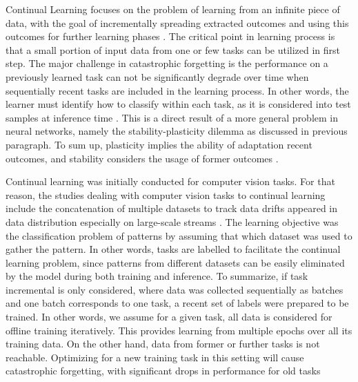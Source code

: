 \documentclass{article}
\begin{document}
Continual Learning focuses on the problem of learning from
an infinite piece of data, with the goal of incrementally spreading extracted outcomes and using this outcomes for further learning phases \cite{chen2018continual}. The critical point in learning process is that a small portion of input data from one or few
tasks can be utilized in first step. The major challenge in catastrophic forgetting is the performance on a previously
learned task can not be significantly degrade
over time when sequentially recent tasks are included in the learning process. In other words, the learner must identify how to classify within each task, as it is considered into test samples at inference time \cite{boschini2022class}. This is a direct result of a more general problem in neural networks, namely the stability-plasticity dilemma as discussed in previous paragraph. To sum up,  plasticity implies the ability of adaptation recent outcomes, and stability considers the usage of former outcomes \cite{de2021continual}. 

Continual learning was initially conducted for computer vision tasks. For that reason, the studies dealing with computer vision tasks to continual learning include the concatenation of multiple datasets to track data drifts appeared in data distribution especially on large-scale streams \cite{cossu2022class}. The learning objective was the classification problem of patterns by assuming that which dataset was used to gather the pattern. In other words, tasks are labelled to facilitate the continual learning problem, since patterns from different datasets can be easily eliminated by the model during both training and inference. To summarize, if task incremental is only considered,
where data was collected sequentially as batches and one batch corresponds to one task, a recent set of labels
were prepared to be trained. In other words, we assume for a given task, all data  is considered for offline training iteratively. This provides learning from multiple epochs over all its training data. 
On the other hand, data from former or further tasks is not reachable. Optimizing for a new training task in this setting will cause catastrophic forgetting, with significant drops in performance for old tasks \cite{parisi2019continual}
\end{document}
